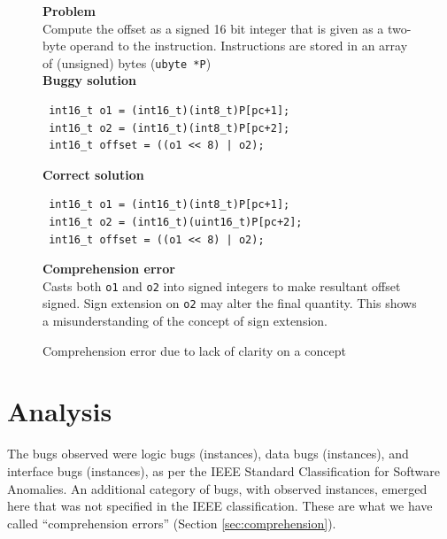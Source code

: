 \documentclass[11pt,letterpaper]{article}
\begin{document}
\begin{figure}
\begin{framed}
\setlength{\parindent}{0cm}

\textbf{Problem}\\
Compute the offset as a signed 16 bit integer that is given as a two-byte operand	to the instruction. Instructions are stored in an array of (unsigned) bytes (\verb|ubyte *P|) \\
 
\textbf{Buggy solution}
\begin{verbatim}
 int16_t o1 = (int16_t)(int8_t)P[pc+1];
 int16_t o2 = (int16_t)(int8_t)P[pc+2];
 int16_t offset = ((o1 << 8) | o2);
\end{verbatim}

\textbf{Correct solution}
\begin{verbatim}
 int16_t o1 = (int16_t)(int8_t)P[pc+1];
 int16_t o2 = (int16_t)(uint16_t)P[pc+2];
 int16_t offset = ((o1 << 8) | o2);
\end{verbatim}

\textbf{Comprehension error}\\ 
Casts both \verb|o1| and \verb|o2| into signed integers to make resultant offset signed. Sign extension on \verb|o2| may alter the final quantity. This shows a misunderstanding of the concept of sign extension.

\end{framed}
\caption{Comprehension error due to lack of clarity on a concept}
\label{fig:comp4}
\end{figure}


\section{Analysis}
\label{sec:analysis}

The bugs observed were logic bugs (\numlogic instances), data bugs (\numdata instances), and interface bugs (\numinterface instances), as per the IEEE Standard Classification for Software Anomalies. An additional category of bugs, with \numcomp observed instances, emerged here that was not specified in the IEEE classification. These are what we have called ``comprehension errors'' (Section \ref{sec:comprehension}).\\
\end{document}
